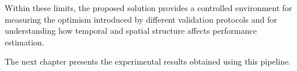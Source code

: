 Within these limits, the proposed solution provides a controlled environment for measuring the optimism introduced by different validation protocols and for understanding how temporal and spatial structure affects performance estimation.

The next chapter presents the experimental results obtained using this pipeline.








